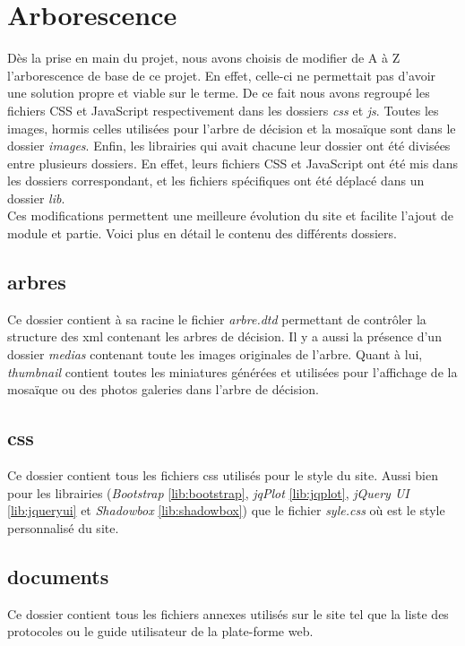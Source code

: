 \documentclass[twoside]{EPURapport}
\begin{document}
	\section{Arborescence}
	Dès la prise en main du projet, nous avons choisis de modifier de A à Z l'arborescence de base de ce projet. En effet, celle-ci ne permettait pas d'avoir une solution propre et viable sur le terme. De ce fait nous avons regroupé les fichiers CSS et JavaScript respectivement dans les dossiers \emph{css} et \emph{js}. Toutes les images, hormis celles utilisées pour l'arbre de décision et la mosaïque sont dans le dossier \emph{images}. Enfin, les librairies qui avait chacune leur dossier ont été divisées entre plusieurs dossiers. En effet, leurs fichiers CSS et JavaScript ont été mis dans les dossiers correspondant, et les fichiers spécifiques ont été déplacé dans un dossier \emph{lib}.\\

	Ces modifications permettent une meilleure évolution du site et facilite l'ajout de module et partie. Voici plus en détail le contenu des différents dossiers.

		\subsection{arbres}
		Ce dossier contient à sa racine le fichier \emph{arbre.dtd} permettant de contrôler la structure des xml contenant les arbres de décision. Il y a aussi la présence d'un dossier \emph{medias} contenant toute les images originales de l'arbre. Quant à lui, \emph{thumbnail} contient toutes les miniatures générées et utilisées pour l'affichage de la mosaïque ou des photos galeries dans l'arbre de décision.
		
		\subsection{css}
		Ce dossier contient tous les fichiers css utilisés pour le style du site. Aussi bien pour les librairies (\emph{Bootstrap} \ref{lib:bootstrap}, \emph{jqPlot} \ref{lib:jqplot}, \emph{jQuery UI} \ref{lib:jqueryui} et \emph{Shadowbox} \ref{lib:shadowbox}) que le fichier \emph{syle.css} où est le style personnalisé du site.
		
		\subsection{documents}
		Ce dossier contient tous les fichiers annexes utilisés sur le site tel que la liste des protocoles ou le guide utilisateur de la plate-forme web.
		
\end{document}
